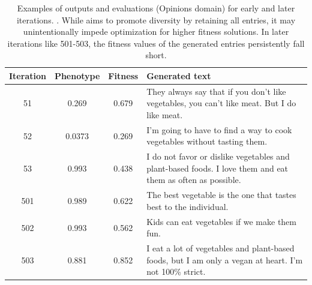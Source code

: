 \begin{table}[ht]
  \caption{Examples of outputs and evaluations (Opinions domain) for early and later iterations. \basethree. While \basethree{} aims to promote diversity by retaining all entries, it may unintentionally impede optimization for higher fitness solutions. In later iterations like 501-503, the fitness values of the generated entries persistently fall short.}
  \label{tab:b3-qualitative-opinion}
  \begin{center}
  \small
  \begin{tabular}{cccp{8.5cm}}
    \toprule
    Iteration     & Phenotype  & Fitness     & Generated text \\
    \midrule
    51 &  0.269 & 0.679 & They always say that if you don't like vegetables, you can't like meat. But I do like meat. \\
    \midrule
    52 & 0.0373 & 0.269 & I'm going to have to find a way to cook vegetables without tasting them. \\
    \midrule
    53 & 0.993 & 0.438 & I do not favor or dislike vegetables and plant-based foods. I love them and eat them as often as possible. \\
    \midrule
    \midrule
    501 &  0.989 & 0.622 & The best vegetable is the one that tastes best to the individual. \\
    \midrule
    502 & 0.993 & 0.562 & Kids can eat vegetables if we make them fun. \\
    \midrule
    503 & 0.881 & 0.852 & I eat a lot of vegetables and plant-based foods, but I am only a vegan at heart. I'm not 100\% strict. \\
    \bottomrule
  \end{tabular}
  \end{center}
  \label{app:iter_opinions_b3}
\end{table}

